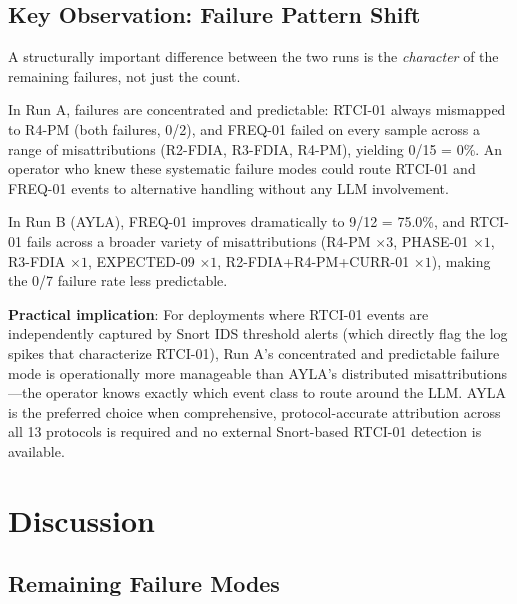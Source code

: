\documentclass[twocolumn, 10pt, letterpaper]{article}
\begin{document}
\subsection*{Key Observation: Failure Pattern Shift}

A structurally important difference between the two runs is the \textit{character}
of the remaining failures, not just the count.

In Run A, failures are concentrated and predictable: RTCI-01 always mismapped
to R4-PM (both failures, 0/2), and FREQ-01 failed on every sample across a
range of misattributions (R2-FDIA, R3-FDIA, R4-PM), yielding 0/15 = 0\%.
An operator who knew these systematic failure modes could route RTCI-01 and
FREQ-01 events to alternative handling without any LLM involvement.

In Run B (AYLA), FREQ-01 improves dramatically to 9/12 = 75.0\%, and
RTCI-01 fails across a broader variety of misattributions (R4-PM $\times 3$,
PHASE-01 $\times 1$, R3-FDIA $\times 1$, EXPECTED-09 $\times 1$,
R2-FDIA+R4-PM+CURR-01 $\times 1$), making the 0/7 failure rate less
predictable.

\textbf{Practical implication}: For deployments where RTCI-01 events are
independently captured by Snort IDS threshold alerts (which directly flag the
log spikes that characterize RTCI-01), Run A's concentrated and predictable
failure mode is operationally more manageable than AYLA's distributed
misattributions---the operator knows exactly which event class to route
around the LLM.
AYLA is the preferred choice when comprehensive, protocol-accurate attribution
across all 13 protocols is required and no external Snort-based RTCI-01
detection is available.

\section{Discussion}
\label{sec:discussion}

\subsection{Remaining Failure Modes}
\end{document}
